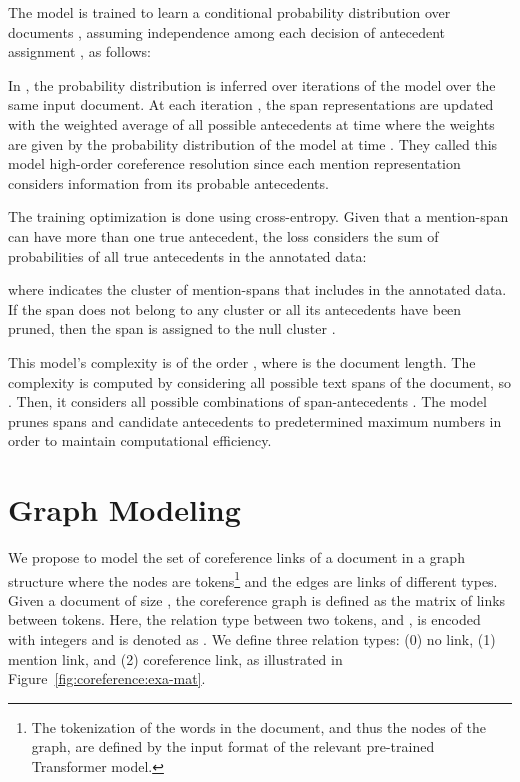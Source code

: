 \documentclass[11pt]{article}
\begin{document}
The model is trained to learn a conditional probability distribution over documents , assuming independence among each decision of antecedent assignment , as follows:


In \cite{lee-etal-2018-higher}, the probability distribution  is inferred over  iterations of the model over the same input document. At each iteration , the span representations are updated with the weighted average of all possible antecedents at time  where the weights are given by the probability distribution of the model at time .  
They called this model high-order coreference resolution since each mention representation considers information from its probable antecedents.  

The training optimization is done using cross-entropy. Given that a mention-span  can have more than one true antecedent, the loss considers the sum of probabilities of all true antecedents in the annotated data: 

where  indicates the cluster of mention-spans that includes  in the annotated data. If the span does not belong to any cluster or all its antecedents have been pruned, then the span is assigned to the null cluster . 

This model's complexity is of the order , where  is the document length. The complexity is computed by considering all possible text spans  of the document, so . Then, it considers all possible combinations of span-antecedents . The model prunes spans and candidate antecedents to predetermined maximum numbers in order to maintain computational efficiency.




\section{Graph Modeling} 
\label{sec:coreference:graph}

We propose to model the set of coreference links of a document in a graph structure where the nodes are tokens\footnote{The tokenization of the words in the document, and thus the nodes of the graph, are defined by the input format of the relevant pre-trained Transformer model.} and the edges are links of different types.  Given a document  of size , the coreference graph is defined as the matrix  of links between tokens. Here, the relation type between two tokens,  and , is encoded with integers and is denoted as . We define three relation types: (0) no link, (1) mention link, and (2) coreference link,
as illustrated in Figure~\ref{fig:coreference:exa-mat}. 
\end{document}
